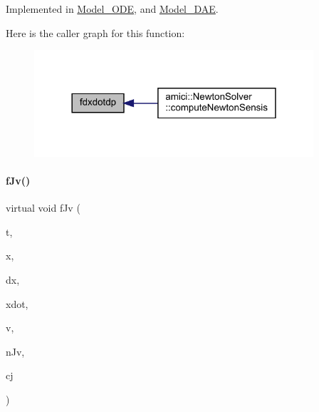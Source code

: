 Implemented in \mbox{\hyperlink{classamici_1_1_model___o_d_e_afd60580b84c72713288796453f6da33a}{Model\+\_\+\+O\+DE}}, and \mbox{\hyperlink{classamici_1_1_model___d_a_e_afd60580b84c72713288796453f6da33a}{Model\+\_\+\+D\+AE}}.

Here is the caller graph for this function\+:
\nopagebreak
\begin{figure}[H]
\begin{center}
\leavevmode
\includegraphics[width=294pt]{classamici_1_1_model_a7ce1e14d4137c249bc44e18345b562b8_icgraph}
\end{center}
\end{figure}
\mbox{\label{classamici_1_1_model_ae08b9d7a7d15898e4dd7c71ac057c6a5}} 
\paragraph{\texorpdfstring{f\+Jv()}{fJv()}}
{\footnotesize\ttfamily virtual void f\+Jv (\begin{DoxyParamCaption}\item[{\mbox{\hyperlink{namespaceamici_a1bdce28051d6a53868f7ccbf5f2c14a3}{realtype}}}]{t,  }\item[{\mbox{\hyperlink{classamici_1_1_ami_vector}{Ami\+Vector}} $\ast$}]{x,  }\item[{\mbox{\hyperlink{classamici_1_1_ami_vector}{Ami\+Vector}} $\ast$}]{dx,  }\item[{\mbox{\hyperlink{classamici_1_1_ami_vector}{Ami\+Vector}} $\ast$}]{xdot,  }\item[{\mbox{\hyperlink{classamici_1_1_ami_vector}{Ami\+Vector}} $\ast$}]{v,  }\item[{\mbox{\hyperlink{classamici_1_1_ami_vector}{Ami\+Vector}} $\ast$}]{n\+Jv,  }\item[{\mbox{\hyperlink{namespaceamici_a1bdce28051d6a53868f7ccbf5f2c14a3}{realtype}}}]{cj }\end{DoxyParamCaption})\hspace{0.3cm}{\ttfamily [pure virtual]}}

